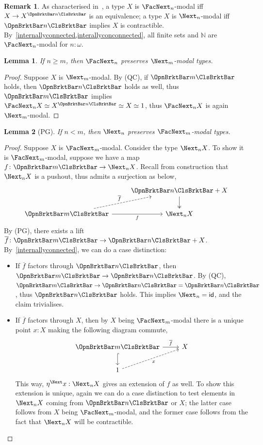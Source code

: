 \documentclass[a4paper,10pt]{amsart}
\newtheorem{lemma}{Lemma}[section]
\theoremstyle{definition}
\newtheorem{remark}{Remark}[section]
\newcommand{\mbb}[1]{\mathbb{#1}}
\newcommand{\ov}[1]{\overline{#1}}
\newcommand{\id}{\mathsf{id}}
\newcommand{\N}{\mbb N}
\newcommand{\ass}[1]{\OpnBrktBar#1\ClsBrktBar}
\newcommand{\opm}[1]{\FacNext_{#1}}
\newcommand{\clm}[1]{\Next_{#1}}
\newcommand{\clmm}{\Next}
\begin{document}
\begin{remark}\label{modaltypes}
  As characterised in~\cite{lmcs:3826}, a type $X$ is $\opm n$-modal iff $X \to X^{\ass n}$ is an equivalence; a type $X$ is $\clm n$-modal iff $\ass n$ implies $X$ is contractible. By~\cref{internallyconnected,interallyconconnected}, all finite sets and $\N$ are $\opm n$-modal for $n:\omega$.
\end{remark}

\begin{lemma}\label{preservemodal1}
  If $n \ge m$, then $\opm n$ preserves $\clm m$-modal types.
\end{lemma}
\begin{proof}
  Suppose $X$ is $\clm m$-modal. By (QC), if $\ass m$ holds, then $\ass n$ holds as well, thus $\ass m$ implies $\opm nX \simeq X^{\ass n} \simeq X \simeq 1$, thus $\opm nX$ is again $\clm m$-modal.
\end{proof}

\begin{lemma}[PG]\label{preservemodal2}
  If $n < m$, then $\clm n$ preserves $\opm m$-modal types.
\end{lemma}
\begin{proof}
  Suppose $X$ is $\opm m$-modal. Consider the type $\clm nX$. To show it is $\opm m$-modal, suppose we have a map $f \colon \ass m \to \clm nX$. Recall from construction that $\clm nX$ is a pushout, thus admits a surjection as below,
  \[
  \begin{tikzcd}
    & \ass n + X \ar[d, two heads] \\
    \ass m \ar[r, "f"'] \ar[ur, dashed, "\ov f"] & \clm nX
  \end{tikzcd}
  \]
  By (PG), there exists a lift $\ov f \colon \ass m \to \ass n + X$. By~\cref{internallyconnected}, we can do a case distinction:
  \begin{itemize}
    \item If $\ov f$ factors through $\ass n$, then $\ass m \to \ass n$. By (QC), $\ass m \to \ass n = \ass n$, thus $\ass n$ holds. This implies $\clm n = \id$, and the claim trivialises.
    \item If $\ov f$ factors through $X$, then by $X$ being $\opm m$-modal there is a unique point $x:X$ making the following diagram commute,
    \[
    \begin{tikzcd}
      \ass m \ar[r, "\ov f"] \ar[d, hook] & X \\
      1 \ar[ur, dashed, "x"']
    \end{tikzcd}
    \]
    This way, $\eta^{\clmm}x : \clm nX$ gives an extension of $f$ as well. To show this extension is unique, again we can do a case distinction to test elements in $\clm nX$ coming from $\ass n$ or $X$; the latter case follows from $X$ being $\opm m$-modal, and the former case follows from the fact that $\clm nX$ will be contractible. \qedhere
  \end{itemize}
\end{proof}
\end{document}
